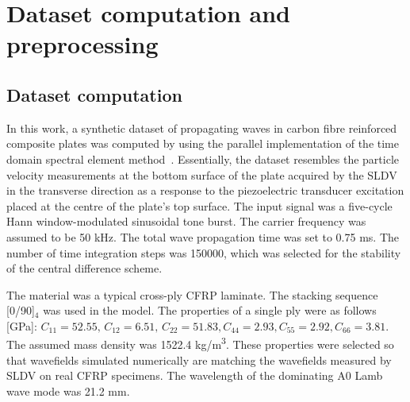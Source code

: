 \section{Dataset computation and preprocessing}
\subsection{Dataset computation}
In this work, a synthetic dataset of propagating waves in carbon fibre reinforced composite plates was computed by using the parallel implementation of the time domain spectral element method~\cite{Kudela2020}. 
Essentially, the dataset resembles the particle velocity measurements at the bottom surface of the plate acquired by the SLDV in the transverse direction as a response to the piezoelectric transducer excitation placed at the centre of the plate's top surface. 
The input signal was a five-cycle Hann window-modulated sinusoidal tone burst. 
The carrier frequency was assumed to be 50 kHz. 
The total wave propagation time was set to 0.75 ms.
The number of time integration steps was 150000, which was selected for the 
stability of the central difference scheme.

The material was a typical cross-ply CFRP laminate. 
The stacking sequence [0/90]\(_4\) was used in the model. 
The properties of a single ply were as follows [GPa]:
\(C_{11} = 52.55, \, C_{12} = 6.51, \, C_{22} = 51.83, C_{44} = 2.93, C_{55} = 
2.92, C_{66} = 3.81\). 
The assumed mass density was 1522.4 kg/m\textsuperscript{3}.
These properties were selected so that wavefields simulated numerically are matching the wavefields measured by SLDV on real CFRP specimens.
The wavelength of the dominating A0 Lamb wave mode was 21.2 mm.

